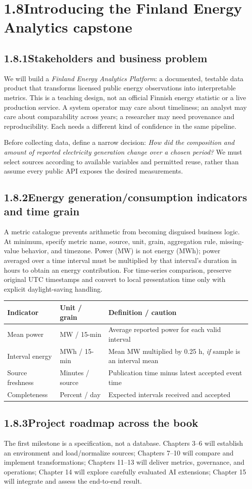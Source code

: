 \documentclass[11pt,twoside]{article}
\newcommand{\topic}[2]{\subsection*{#1\quad #2}}
\begin{document}
\section*{1.8\quad Introducing the Finland Energy Analytics capstone}
\topic{1.8.1}{Stakeholders and business problem}
We will build a \emph{Finland Energy Analytics Platform}: a documented, testable data product that transforms licensed public energy observations into interpretable metrics. This is a teaching design, not an official Finnish energy statistic or a live production service. A system operator may care about timeliness; an analyst may care about comparability across years; a researcher may need provenance and reproducibility. Each needs a different kind of confidence in the same pipeline.

Before collecting data, define a narrow decision: \emph{How did the composition and amount of reported electricity generation change over a chosen period?} We must select sources according to available variables and permitted reuse, rather than assume every public API exposes the desired measurements.

\topic{1.8.2}{Energy generation/consumption indicators and time grain}
A metric catalogue prevents arithmetic from becoming disguised business logic. At minimum, specify metric name, source, unit, grain, aggregation rule, missing-value behavior, and timezone. Power (MW) is not energy (MWh); power averaged over a time interval must be multiplied by that interval's duration in hours to obtain an energy contribution. For time-series comparison, preserve original UTC timestamps and convert to local presentation time only with explicit daylight-saving handling.

\begin{center}\small
\begin{tabularx}{\linewidth}{@{}p{27mm}p{26mm}X@{}}\toprule
\textbf{Indicator} & \textbf{Unit / grain} & \textbf{Definition / caution}\\\midrule
Mean power & MW / 15-min & Average reported power for each valid interval\\
Interval energy & MWh / 15-min & Mean MW multiplied by 0.25 h, \emph{if} sample is an interval mean\\
Source freshness & Minutes / source & Publication time minus latest accepted event time\\
Completeness & Percent / day & Expected intervals received and accepted\\
\bottomrule\end{tabularx}
\end{center}
\topic{1.8.3}{Project roadmap across the book}
The first milestone is a specification, not a database. Chapters 3--6 will establish an environment and load/normalize sources; Chapters 7--10 will compare and implement transformations; Chapters 11--13 will deliver metrics, governance, and operations; Chapter 14 will explore carefully evaluated AI extensions; Chapter 15 will integrate and assess the end-to-end result.
\end{document}
